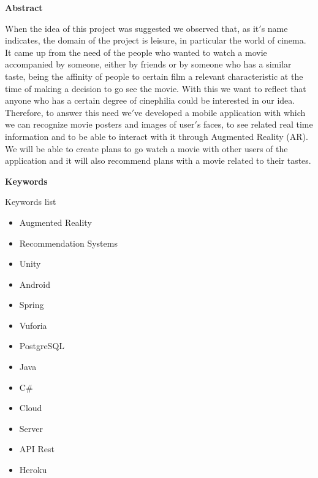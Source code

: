 
\newpage

\thispagestyle{empty}

\begin{center}

{\bf \Huge Abstract}

  \end{center}
\vspace{1cm}

When the idea of this project was suggested we observed that, as it$'$s name indicates, the
domain of the project is leisure, in particular the world of cinema. It came up from the need of 
the people who wanted to watch a movie accompanied by someone, either by friends or by someone who has
a similar taste, being the affinity of people to certain film a relevant characteristic at the time of making
a decision to go see the movie. With this we want to reflect that anyone who has a certain degree of cinephilia could be interested
in our idea. Therefore, to answer this need we$'$ve developed a mobile application with which we can recognize movie
posters and images of user$'$s faces, to see related real time information and to be able to interact with it through 
Augmented Reality (AR). We will be able to create plans to go watch a movie with other users of the application and it 
will also recommend plans with a movie related to their tastes.

\vspace{1cm}

\begin{center}

  {\bf \Large Keywords}
  
     \end{center}
  
     \vspace{0.5cm}
     
     Keywords list
     \begin{itemize}  
      \item Augmented Reality
      \item Recommendation Systems
      \item Unity
      \item Android
      \item Spring
      \item Vuforia
      \item PostgreSQL
      \item Java
      \item C\#
      \item Cloud
      \item Server
      \item API Rest
      \item Heroku
    \end{itemize}
   


